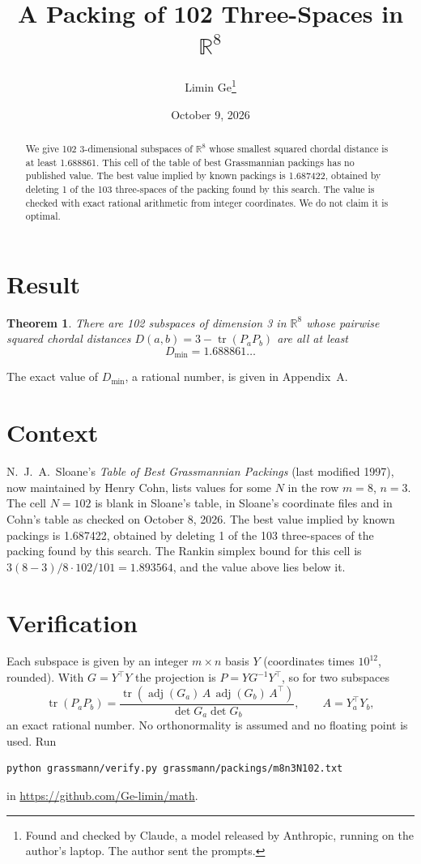 \documentclass[11pt,a4paper]{article}
\title{A Packing of 102 Three-Spaces in $\mathbb{R}^{8}$}
\author{Limin Ge\thanks{Found and checked by Claude, a model released by Anthropic, running on the author's laptop. The author sent the prompts.}}
\date{October 9, 2026}
\newtheorem*{theorem}{Theorem}
\begin{document}
\maketitle
\begin{abstract}
We give 102 3-dimensional subspaces of $\mathbb{R}^{8}$ whose smallest squared chordal distance is at least 1.688861. This cell of the table of best Grassmannian packings has no published value. The best value implied by known packings is 1.687422, obtained by deleting 1 of the 103 three-spaces of the packing found by this search. The value is checked with exact rational arithmetic from integer coordinates. We do not claim it is optimal.
\end{abstract}

\section{Result}
\begin{theorem}
There are 102 subspaces of dimension 3 in $\mathbb{R}^{8}$ whose pairwise squared chordal distances $D(a,b) = 3 - \operatorname{tr}(P_aP_b)$ are all at least
\[ D_{\min} = 1.688861\ldots \]
\end{theorem}
The exact value of $D_{\min}$, a rational number, is given in Appendix~A.


\section{Context}
N.~J.~A.~Sloane's \emph{Table of Best Grassmannian Packings} (last modified 1997), now maintained by Henry Cohn, lists values for some $N$ in the row $m=8$, $n=3$. The cell $N=102$ is blank in Sloane's table, in Sloane's coordinate files and in Cohn's table as checked on October 8, 2026. The best value implied by known packings is 1.687422, obtained by deleting 1 of the 103 three-spaces of the packing found by this search. The Rankin simplex bound for this cell is $3(8-3)/8\cdot 102/101 = 1.893564$, and the value above lies below it.


\section{Verification}
Each subspace is given by an integer $m\times n$ basis $Y$ (coordinates times $10^{12}$, rounded). With $G=Y^\top Y$ the projection is $P=YG^{-1}Y^\top$, so for two subspaces
\[ \operatorname{tr}(P_aP_b)=\frac{\operatorname{tr}(\operatorname{adj}(G_a)\,A\,\operatorname{adj}(G_b)\,A^\top)}{\det G_a\det G_b},\qquad A=Y_a^\top Y_b, \]
an exact rational number. No orthonormality is assumed and no floating point is used. Run
\begin{verbatim}
python grassmann/verify.py grassmann/packings/m8n3N102.txt
\end{verbatim}
in \url{https://github.com/Ge-limin/math}.
\end{document}
